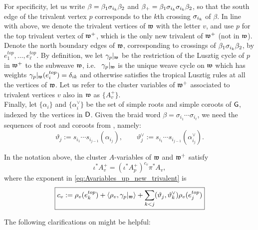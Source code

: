 \noindent For specificity, let us write $\beta=\beta_1\sigma_{i_k}\beta_2$ and $\beta_+=\beta_1\sigma_{i_k}\sigma_{i_k}\beta_2$, so that the south edge of the trivalent vertex $p$ corresponds to the $k$th crossing $\sigma_{i_k}$ of $\beta$. In line with above, we denote the trivalent vertices of $\mathfrak{w}$ with the letter $v$, and use $p$ for the top trivalent vertex of $\mathfrak{w}^+$, which is the only new trivalent of $\mathfrak{w}^+$ (not in $\mathfrak{w}$). Denote the north boundary edges of $\mathfrak{w}$, corresponding to crossings of $\beta_1\sigma_{i_k}\beta_2$, by $e_1^{top},\ldots,e_\ell^{top}$. By definition, we let $\gamma_p|_{\mathfrak{w}}$ be the restriction of the Lusztig cycle of $p$ in $\mathfrak{w}^+$ to the subweave $\mathfrak{w}$, i.e.~ $\gamma_p|_{\mathfrak{w}}$ is the unique weave cycle on $\mathfrak{w}$ which has weights $\gamma_p|_{\mathfrak{w}}(e_i^{top})=\delta_{ik}$ and otherwise satisfies the tropical Lusztig rules at all the vertices of $\mathfrak{w}$. Let us refer to the cluster variables of $\mathfrak{w}^+$ associated to trivalent vertices $v$ also in $\mathfrak{w}$ as $\{A_v^+\}$.\\

Finally, let $\{\alpha_i\}$ and $\{\alpha_i^\vee\}$ be the set of simple roots and simple coroots of $\mathsf{G}$, indexed by the vertices in $\mathsf{D}$. Given the braid word $\beta=\sigma_{i_1}\cdots\sigma_{i_\ell}$, we need the sequences of root and coroots from \cite[Equation (16)]{CGGLSS25}, namely:
\begin{equation}\label{eq:roots_coroots}
 \vartheta_j:=s_{i_1}\cdots s_{i_{j-1}}(\alpha_{i_j}),
 \qquad
 \vartheta_j^\vee:=s_{i_1}\cdots s_{i_{j-1}}(\alpha_{i_j}^\vee).
\end{equation}


\begin{proposition}\label{prop:Avariables_up_new_trivalent} In the notation above, the cluster $A$-variables of $\mathfrak{w}$ and $\mathfrak{w}^+$ satisfy
\begin{equation}\label{eq:Avariables_up_new_trivalent}
\iota^*A^+_v=(\iota^*A_p^+)^{c_v}\pi^*A_v,
\end{equation}
\noindent where the exponent in \eqref{eq:Avariables_up_new_trivalent} is
\begin{equation}\label{eq:c_exponent}
 \boxed{
 c_v:=\rho_v(e_k^{top})
 +\langle\rho_v,\gamma_p|_{\mathfrak{w}}\rangle
 +\sum_{k<j}(\vartheta_j,\vartheta_{k}^\vee)\rho_v(e_j^{top})}
\end{equation}
\sbs
\end{proposition}

\noindent The following clarifications on  might be helpful:\\

